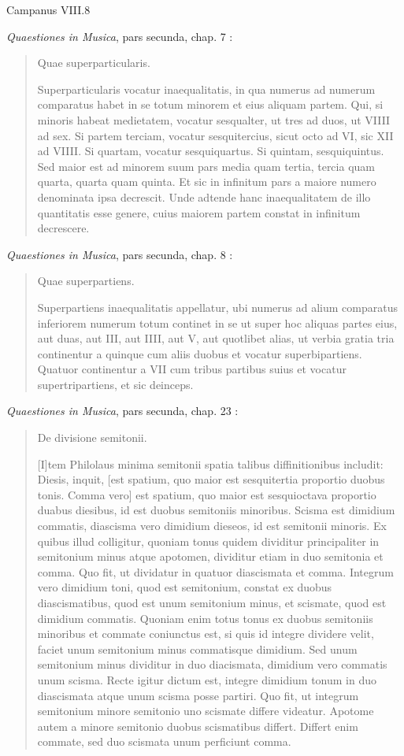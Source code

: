 \documentclass{article}
\theoremstyle{definition}
\begin{document}
Campanus VIII.8 \cite{campanusI}

{\em Quaestiones in Musica}, pars secunda, chap. 7 \cite[p.~77]{steglich}:

\begin{quote}
Quae superparticularis.

Superparticularis vocatur inaequalitatis, in qua numerus ad numerum
comparatus habet in se totum minorem et eius aliquam partem. Qui, si
minoris habeat medietatem, vocatur sesqualter, ut tres ad duos, ut VIIII
ad sex. Si partem terciam, vocatur sesquitercius, sicut octo ad VI, sic XII
ad VIIII. Si quartam, vocatur sesquiquartus. Si quintam, sesquiquintus.
Sed maior est ad minorem suum pars media quam tertia,
tercia quam quarta, quarta quam quinta. Et sic in infinitum pars a maiore
numero denominata ipsa decrescit. Unde adtende hanc inaequalitatem de
illo quantitatis esse genere, cuius maiorem partem constat in infinitum
decrescere.
\end{quote}

{\em Quaestiones in Musica}, pars secunda, chap. 8 \cite[p.~77]{steglich}:

\begin{quote}
Quae superpartiens.

Superpartiens inaequalitatis appellatur, ubi numerus ad alium comparatus
inferiorem numerum totum continet in se ut super hoc aliquas partes eius,
aut duas, aut III, aut IIII, aut V, aut quotlibet alias, ut verbia gratia tria
continentur a quinque cum aliis duobus et vocatur superbipartiens. Quatuor
continentur a VII cum tribus partibus suius et vocatur supertripartiens, et
sic deinceps. 
\end{quote}

{\em Quaestiones in Musica}, pars secunda, chap. 23 \cite[p.~89]{steglich}:

\begin{quote}
De divisione semitonii.

[I]tem Philolaus minima semitonii spatia talibus diffinitionibus includit:
Diesis, inquit, [est spatium, quo maior est sesquitertia proportio duobus
tonis. Comma vero] est spatium, quo maior est sesquioctava proportio
duabus diesibus, id est duobus semitoniis minoribus. Scisma est dimidium
commatis, diascisma vero dimidium dieseos, id est semitonii minoris.
Ex quibus illud colligitur, quoniam tonus quidem dividitur principaliter
in semitonium minus atque apotomen, dividitur etiam in duo semitonia
et comma. Quo fit, ut dividatur in quatuor diascismata et comma.
Integrum vero dimidium toni, quod est semitonium, constat ex duobus
diascismatibus, quod est unum semitonium minus, et scismate, quod est
dimidium commatis. Quoniam enim totus tonus ex duobus semitoniis
minoribus et commate coniunctus est, si quis id integre dividere velit,
faciet unum semitonium minus commatisque dimidium. Sed unum semitonium
minus dividitur in duo diacismata, dimidium vero commatis unum
scisma. Recte igitur dictum est, integre dimidium tonum in duo diascismata
atque unum scisma posse partiri. Quo fit, ut integrum semitonium
minore semitonio uno scismate differe videatur. Apotome autem
a minore semitonio duobus scismatibus differt. Differt enim commate,
sed duo scismata unum perficiunt comma.
\end{quote}
\end{document}
